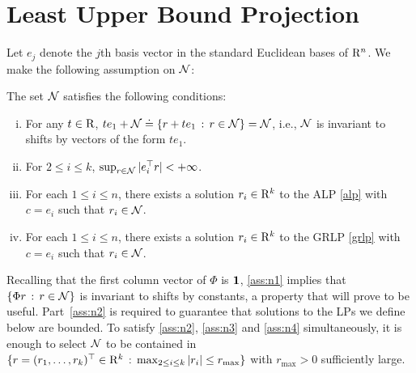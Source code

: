 \section{Least Upper Bound Projection}\label{sec:lubp}
Let $e_j$ denote the $j$th basis vector in the standard Euclidean bases of $\mathrm{R}^n$.
We make the following assumption on $\mathcal{N}$:
\begin{assumption}
\label{ass:n}
The set $\mathcal{N}$ satisfies the following conditions:
\begin{enumerate}[(i)]
\item \label{ass:n1}
For any $t\in \mathrm{R}$, $t e_1 + \mathcal{N} \doteq \{ r + t e_1 \,:\, r\in \mathcal{N} \} = \mathcal{N}$, i.e., 
$\mathcal{N}$ is invariant to shifts by vectors of the form $t e_1$.
\item \label{ass:n2}
For $2\le i \le k$, $\sup_{r\in \mathcal{N}} | e_i^\top r | <+\infty$.
\item \label{ass:n3}
For each $1\le i \le n$, there exists a solution $r_i\in \mathrm{R}^k$ to the ALP \eqref{alp} with $c = e_i$ such that
$r_i\in \mathcal{N}$.
\item \label{ass:n4}
For each $1\le i \le n$, there exists a solution $r_i\in \mathrm{R}^k$ to the GRLP \eqref{grlp} with $c = e_i$ such that
$r_i\in \mathcal{N}$.
\end{enumerate}
\end{assumption}
Recalling that the first column vector of $\Phi$ is $\mathbf{1}$, \eqref{ass:n1} implies that $\{\Phi r \,:\,r\in \mathcal{N} \}$ is invariant to shifts by constants, a property that will prove to be useful.
Part~\eqref{ass:n2} is required to guarantee that solutions to the LPs we define below are bounded.
To satisfy \eqref{ass:n2}, \eqref{ass:n3} and \eqref{ass:n4} 
simultaneously, it is enough to select $\mathcal{N}$ to be contained in 
$\{ r = (r_1,\dots,r_k)^\top \in \mathrm{R}^k \,:\, \max_{2\le i \le k} |r_i| \le r_{\max} \}$ with $r_{\max}>0$ sufficiently large.

